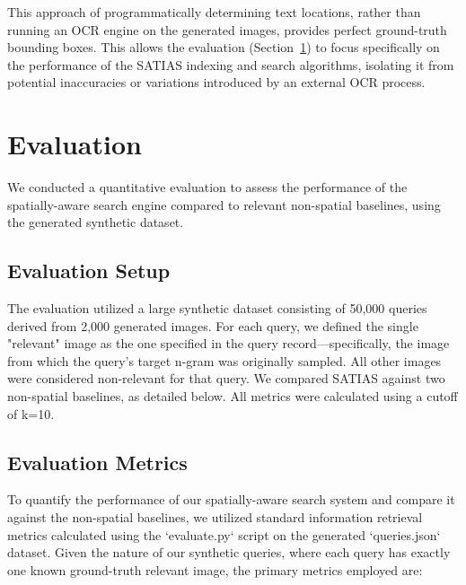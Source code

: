 \documentclass[manuscript,screen]{acmart}
\begin{document}
This approach of programmatically determining text locations, rather than running an OCR engine on the generated images, provides perfect ground-truth bounding boxes. This allows the evaluation (Section~\ref{sec:evaluation}) to focus specifically on the performance of the SATIAS indexing and search algorithms, isolating it from potential inaccuracies or variations introduced by an external OCR process.

\section{Evaluation}
\label{sec:evaluation}

We conducted a quantitative evaluation to assess the performance of the spatially-aware search engine compared to relevant non-spatial baselines, using the generated synthetic dataset.

\subsection{Evaluation Setup}

The evaluation utilized a large synthetic dataset consisting of 50,000 queries derived from 2,000 generated images. For each query, we defined the single "relevant" image as the one specified in the query record—specifically, the image from which the query's target n-gram was originally sampled. All other images were considered non-relevant for that query. We compared SATIAS against two non-spatial baselines, as detailed below. All metrics were calculated using a cutoff of k=10.

\subsection{Evaluation Metrics}
\label{sec:evaluation_metrics}

To quantify the performance of our spatially-aware search system and compare it against the non-spatial baselines, we utilized standard information retrieval metrics calculated using the `evaluate.py` script on the generated `queries.json` dataset. Given the nature of our synthetic queries, where each query has exactly one known ground-truth relevant image, the primary metrics employed are:
\end{document}

